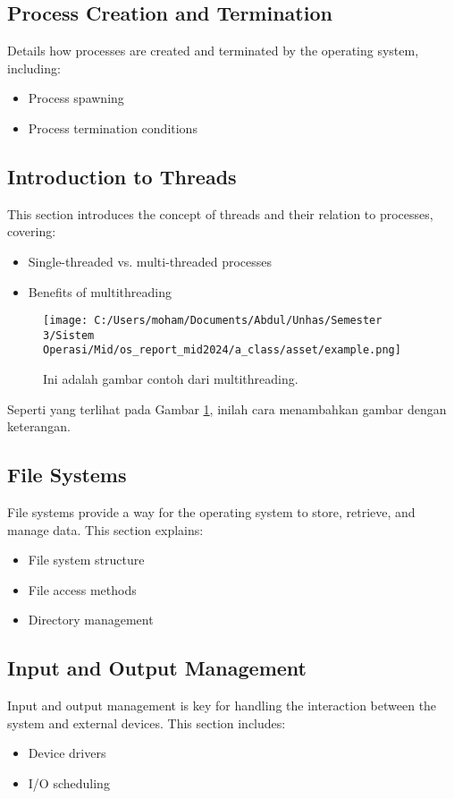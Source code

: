 \documentclass[12pt]{article}
\begin{document}
\subsection{Process Creation and Termination}
Details how processes are created and terminated by the operating system, including:
\begin{itemize}
    \item Process spawning
    \item Process termination conditions
\end{itemize}

\subsection{Introduction to Threads}
This section introduces the concept of threads and their relation to processes, covering:
\begin{itemize}
    \item Single-threaded vs. multi-threaded processes
    \item Benefits of multithreading
\end{itemize}

\begin{figure}[h]
    \centering
    \texttt{[image: C:/Users/moham/Documents/Abdul/Unhas/Semester 3/Sistem Operasi/Mid/os\_report\_mid2024/a\_class/asset/example.png]}  %
    \caption{Ini adalah gambar contoh dari multithreading.}
    \label{fig:contoh_gambar}
\end{figure}

Seperti yang terlihat pada Gambar \ref{fig:contoh_gambar}, inilah cara menambahkan gambar dengan keterangan.

\subsection{File Systems}
File systems provide a way for the operating system to store, retrieve, and manage data. This section explains:
\begin{itemize}
    \item File system structure
    \item File access methods
    \item Directory management
\end{itemize}

\subsection{Input and Output Management}
Input and output management is key for handling the interaction between the system and external devices. This section includes:
\begin{itemize}
    \item Device drivers
    \item I/O scheduling
\end{itemize}
\end{document}
